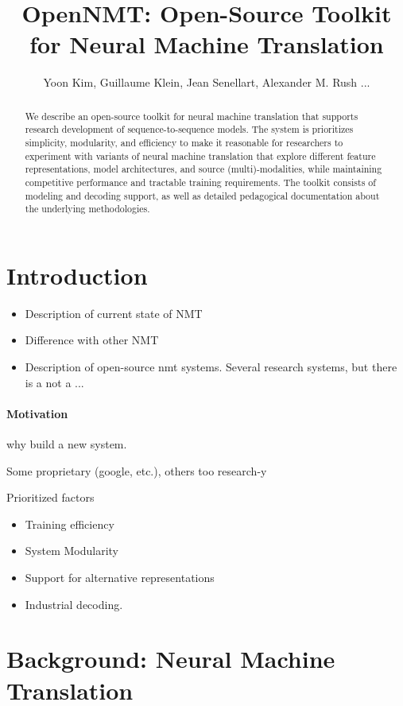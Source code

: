 \documentclass[11pt]{article}
\title{OpenNMT: Open-Source Toolkit for Neural Machine Translation}
\author{Yoon Kim, Guillaume Klein, Jean Senellart, Alexander M. Rush ... }
\date{}
\begin{document}
\maketitle
\begin{abstract}

  We describe an open-source toolkit for neural machine translation
  that supports research development of sequence-to-sequence models.
  The system is prioritizes simplicity, modularity, and efficiency to
  make it reasonable for researchers to experiment with variants of
  neural machine translation that explore different feature
  representations, model architectures, and source (multi)-modalities,
  while maintaining competitive performance and tractable training
  requirements. The toolkit consists of modeling and decoding support,
  as well as detailed pedagogical documentation about the underlying
  methodologies.

\end{abstract}

\section{Introduction}


\begin{itemize}
\item Description of current state of NMT
\item Difference with other NMT
\item Description of open-source nmt systems. Several research systems, but there is a not a ... 
\end{itemize}


\paragraph{Motivation}

why build a new system.

Some proprietary (google, etc.), others too research-y

Prioritized factors

\begin{itemize}
\item Training efficiency
\item System Modularity
\item Support for alternative representations
\item Industrial decoding.
\end{itemize}


\section{Background: Neural Machine Translation}
\end{document}
